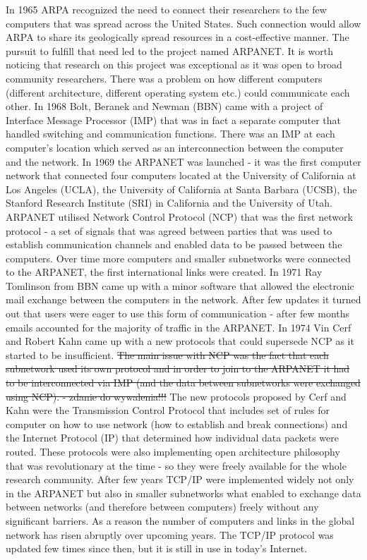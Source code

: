 \documentclass[magisterska,en]{pracamgr}
\begin{document}
In 1965 ARPA recognized the need to connect their researchers to the few computers that was spread across the United States. Such connection would allow ARPA to share its geologically spread resources in a cost-effective manner. The pursuit to fulfill that need led to the project named ARPANET. It is worth noticing that research on this project was exceptional as it was open to broad community researchers.\cite{an_early_history_of_the_internet} There was a problem on how different computers (different architecture, different operating system etc.) could communicate each other. In 1968 Bolt, Beranek and Newman (BBN) came with a project of Interface Message Processor (IMP) that was in fact a separate computer that handled switching and communication functions. There was an IMP at each computer's location which served as an interconnection between the computer and the network. In 1969 the ARPANET was launched - it was the first computer network that connected four computers located at the University of California at Los Angeles (UCLA), the University of California at Santa Barbara (UCSB), the Stanford Research Institute (SRI) in California and the University of Utah. ARPANET utilised Network Control Protocol (NCP) that was the first network protocol - a set of signals that was agreed between parties that was used to establish communication channels and enabled data to be passed between the computers. Over time more computers and smaller subnetworks were connected to the ARPANET, the first international links were created. In 1971 Ray Tomlinson from BBN came up with a minor software that allowed the electronic mail exchange between the computers in the network. After few updates it turned out that users were eager to use this form of communication - after few months emails accounted for the majority of traffic in the ARPANET.  \cite{an_early_history_of_the_internet} In 1974 Vin Cerf and Robert Kahn came up with a new protocols that could supersede NCP as it started to be insufficient. \sout{The main issue with NCP was the fact that each subnetwork used its own protocol and in order to join to the ARPANET it had to be interconnected via IMP (and the data between subnetworks were exchanged using NCP). - zdanie do wywalenia!!!} \cite{an_early_history_of_the_internet} The new protocols proposed by Cerf and Kahn were the Transmission Control Protocol that includes set of rules for computer on how to use network (how to establish and break connections) and the Internet Protocol (IP) that determined how individual data packets were routed. These protocols were also implementing open architecture philosophy that was revolutionary at the time - so they were freely available for the whole research community. \cite{Internet_History_article} After few years TCP/IP were implemented widely not only in the ARPANET but also in smaller subnetworks what enabled to exchange data between networks (and therefore between computers) freely without any significant barriers. As a reason the number of computers and links in the global network has risen abruptly over upcoming years. The TCP/IP protocol was updated few times since then, but it is still in use in today's Internet. 
\end{document}
